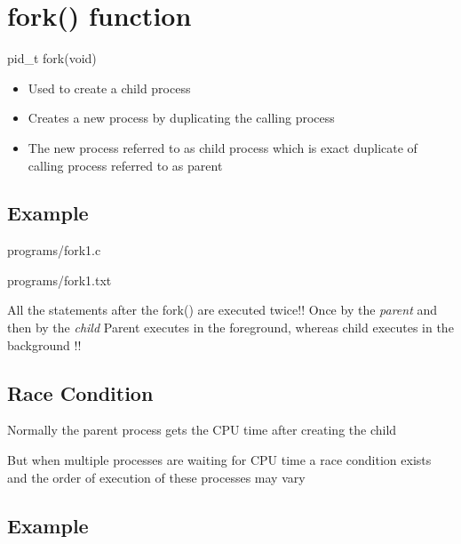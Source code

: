 \documentclass[11pt,fleqn]{book} %
\begin{document}
\section{fork() function}

\begin{myremark}{
pid\_t fork(void)}
\end{myremark}

\begin{itemize}
	\item Used to create a child process
	\item Creates a new process by duplicating the calling process
	\item The new process referred to as child process which is exact duplicate of calling process referred to as parent
\end{itemize}

\subsection*{Example}

\begin{mycode}{programs/fork1.c}
\end{mycode}

\begin{myoutput}{programs/fork1.txt}
\end{myoutput}

\begin{myremark}{
All the statements after the fork() are executed twice!!
\linebreak Once by the \textit{parent} and then by the \textit{child}
\linebreak Parent executes in the foreground, whereas child executes in the background !!}
\end{myremark}

\subsection{Race Condition}
Normally the parent process gets the CPU time after creating the child


But when multiple processes are waiting for CPU time a race condition exists and the order of execution of these processes may vary

\subsection*{Example}
\end{document}

